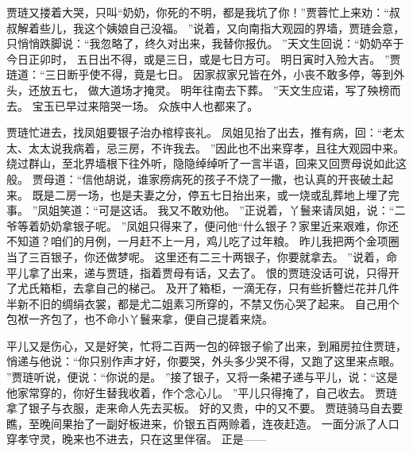 贾琏又搂着大哭，只叫“奶奶，你死的不明，都是我坑了你！”贾蓉忙上来劝：“叔叔解着些儿，我这个姨娘自己没福。
”说着，又向南指大观园的界墙，贾琏会意，只悄悄跌脚说：“我忽略了，终久对出来，我替你报仇。
”天文生回说：“奶奶卒于今日正卯时，
五日出不得，或是三日，或是七日方可。
明日寅时入殓大吉。
”贾琏道：“三日断乎使不得，竟是七日。
因家叔家兄皆在外，小丧不敢多停，等到外头，还放五七，
做大道场才掩灵。
明年往南去下葬。
”天文生应诺，写了殃榜而去。
宝玉已早过来陪哭一场。
众族中人也都来了。
\par
贾琏忙进去，找凤姐要银子治办棺椁丧礼。
凤姐见抬了出去，推有病，回：“老太太、太太说我病着，忌三房，不许我去。
”因此也不出来穿孝，且往大观园中来。
绕过群山，至北界墙根下往外听，隐隐绰绰听了一言半语，回来又回贾母说如此这般。
贾母道：“信他胡说，谁家痨病死的孩子不烧了一撒，也认真的开丧破土起来。
既是二房一场，也是夫妻之分，停五七日抬出来，或一烧或乱葬地上埋了完事。
”凤姐笑道：“可是这话。
我又不敢劝他。
”正说着，丫鬟来请凤姐，说：“二爷等着奶奶拿银子呢。
”凤姐只得来了，便问他“什么银子？家里近来艰难，你还不知道？咱们的月例，一月赶不上一月，鸡儿吃了过年粮。
昨儿我把两个金项圈当了三百银子，你还做梦呢。
这里还有二三十两银子，你要就拿去。
”说着，命平儿拿了出来，递与贾琏，指着贾母有话，又去了。
恨的贾琏没话可说，只得开了尤氏箱柜，去拿自己的梯己。
及开了箱柜，一滴无存，只有些折簪烂花并几件半新不旧的绸绢衣裳，都是尤二姐素习所穿的，不禁又伤心哭了起来。
自己用个包袱一齐包了，也不命小丫鬟来拿，便自己提着来烧。
\par
平儿又是伤心，又是好笑，忙将二百两一包的碎银子偷了出来，到厢房拉住贾琏，悄递与他说：“你只别作声才好，你要哭，外头多少哭不得，又跑了这里来点眼。
”贾琏听说，便说：“你说的是。
”接了银子，又将一条裙子递与平儿，说：“这是他家常穿的，你好生替我收着，作个念心儿。
”平儿只得掩了，自己收去。
贾琏拿了银子与衣服，走来命人先去买板。
好的又贵，中的又不要。
贾琏骑马自去要瞧，至晚间果抬了一副好板进来，价银五百两赊着，连夜赶造。
一面分派了人口穿孝守灵，晚来也不进去，只在这里伴宿。
正是——\par
{}
